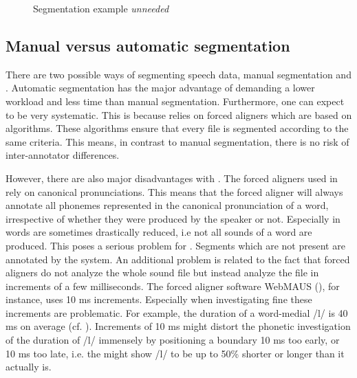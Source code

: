 \begin{figure}
	\caption{Segmentation example \textit{unneeded}}
	\label{fig:segmentation unneeded}
\end{figure}

\subsection{Manual versus automatic segmentation}
There are two possible ways of segmenting speech data, manual segmentation and . Automatic segmentation has the major advantage of demanding a lower workload and less time than manual segmentation. Furthermore, one can expect  to be very systematic. This is because  relies on forced aligners which are based on algorithms. These algorithms ensure that every file is segmented according to the same criteria. This means, in contrast to manual segmentation, there is no risk of inter-annotator differences.

However, there are also major disadvantages with . The forced aligners used in  rely on canonical pronunciations. This means that the forced aligner will always annotate all phonemes represented in the canonical pronunciation of a word, irrespective of whether they were produced by the speaker or not.  Especially in  words are sometimes drastically reduced, i.e not all sounds of a word are produced. This poses a serious problem for . Segments which are not present are annotated by the system.
An additional problem is related to the fact that forced aligners do not analyze the whole sound file but instead analyze the file in increments of a few milliseconds. The forced aligner software WebMAUS (\citealt{Schiel.1999,Kisler.2016}), for instance, uses 10 ms increments. Especially when investigating fine  these increments are problematic. For example, the duration of a word-medial /l/ is 40 ms on average (cf. \citealt{Umeda.1977}). Increments of 10 ms might distort the phonetic investigation of the duration of /l/ immensely by positioning a boundary 10 ms too early, or 10 ms too late, i.e. the  might show /l/ to be up to 50\% shorter or longer than it actually is.

